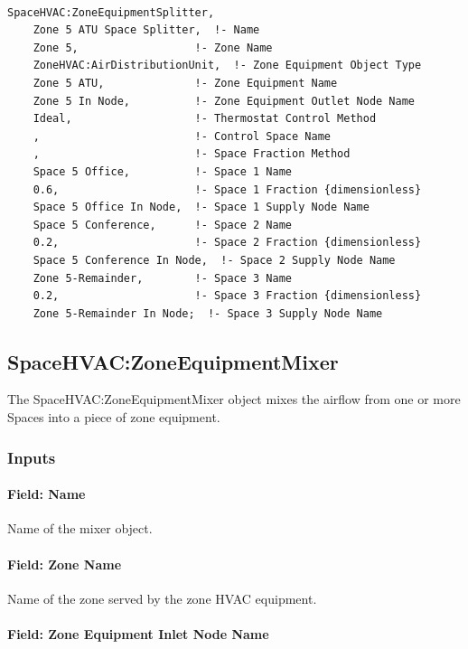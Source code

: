 \begin{lstlisting}

SpaceHVAC:ZoneEquipmentSplitter,
    Zone 5 ATU Space Splitter,  !- Name
    Zone 5,                  !- Zone Name
    ZoneHVAC:AirDistributionUnit,  !- Zone Equipment Object Type
    Zone 5 ATU,              !- Zone Equipment Name
    Zone 5 In Node,          !- Zone Equipment Outlet Node Name
    Ideal,                   !- Thermostat Control Method
    ,                        !- Control Space Name
    ,                        !- Space Fraction Method
    Space 5 Office,          !- Space 1 Name
    0.6,                     !- Space 1 Fraction {dimensionless}
    Space 5 Office In Node,  !- Space 1 Supply Node Name
    Space 5 Conference,      !- Space 2 Name
    0.2,                     !- Space 2 Fraction {dimensionless}
    Space 5 Conference In Node,  !- Space 2 Supply Node Name
    Zone 5-Remainder,        !- Space 3 Name
    0.2,                     !- Space 3 Fraction {dimensionless}
    Zone 5-Remainder In Node;  !- Space 3 Supply Node Name
\end{lstlisting}

\subsection{SpaceHVAC:ZoneEquipmentMixer}\label{spacehvaczoneequipmentmixer}

The SpaceHVAC:ZoneEquipmentMixer object mixes the airflow from one or more Spaces into a piece of zone equipment.

\subsubsection{Inputs}\label{inputs-1-052-seqmixer}

\paragraph{Field: Name}\label{field-seqmixer-name-015}

Name of the mixer object.

\paragraph{Field: Zone Name}\label{field-seqmixer-zone-name}

Name of the zone served by the zone HVAC equipment.

\paragraph{Field: Zone Equipment Inlet Node Name}\label{field-seqmixer-zone-equipment-inlet-node-name}

